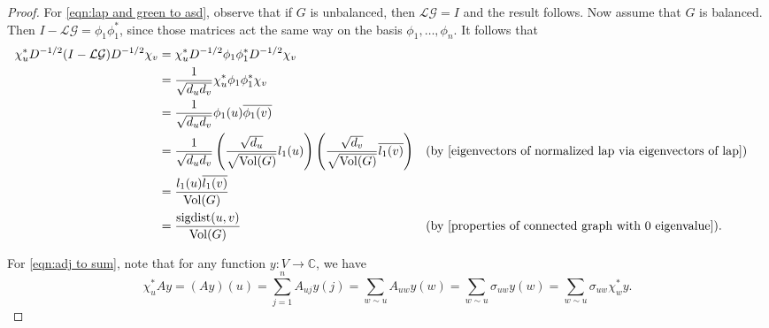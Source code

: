 \documentclass{article}
\theoremstyle{definition}
\newcommand{\C}{\mathbb C}
\DeclareMathOperator{\sigdist}{sigdist}
\DeclareMathOperator{\vol}{Vol}
\newcommand{\lap}{\mathcal{L}}
\newcommand{\green}{\mathcal{G}}
\begin{document}
\begin{proof}
For \cref{eqn:lap and green to asd}, observe that if $G$ is unbalanced, then $\lap \green = I$ and the result follows. Now assume that $G$ is balanced. Then $I - \lap \green = \phi_1 \phi_1^*$, since those matrices act the same way on the basis $\phi_1, \dots, \phi_n$. It follows that
\begin{align*}
\chi_u^* D^{-1/2} (I - \lap \green) D^{-1/2} \chi_v
&= \chi_u^* D^{-1/2} \phi_1 \phi_1^* D^{-1/2} \chi_v \\
&= \frac{1}{\sqrt{d_u d_v}} \chi_u^* \phi_1 \phi_1^* \chi_v \\
&= \frac{1}{\sqrt{d_u d_v}} \phi_1(u) \overline{\phi_1(v)} \\
&= \frac{1}{\sqrt{d_u d_v}} \left( \frac{\sqrt{d_u}}{\sqrt{\vol(G)}} l_1(u) \right) \left( \frac{\sqrt{d_v}}{\sqrt{\vol(G)}} \overline{l_1(v)} \right) && \text{(by \cref{eigenvectors of normalized lap via eigenvectors of lap})} \\
&= \frac{l_1(u) \overline{l_1(v)}}{\vol(G)} \\
&= \frac{\sigdist(u, v)}{\vol(G)} && \text{(by \cref{properties of connected graph with 0 eigenvalue})}.
\end{align*}

For \cref{eqn:adj to sum}, note that for any function $y: V \rightarrow \C$, we have
$$
\chi_u^* A y = (A y)(u) = \sum_{j=1}^n A_{uj} y(j) = \sum_{w \sim u} A_{uw} y(w) = \sum_{w \sim u} \sigma_{uw} y(w) = \sum_{w \sim u} \sigma_{uw} \chi^*_w y.
$$
\end{proof}



\end{document}
